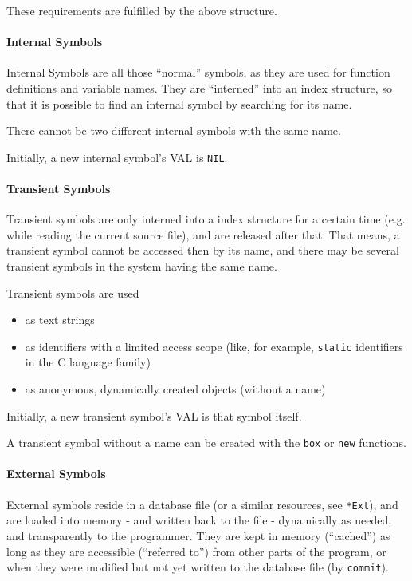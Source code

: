 These requirements are fulfilled by the above structure.

 

\paragraph{Internal Symbols}
\label{sec:refm-internal-symbols}%
Internal Symbols are all those ``normal'' symbols, as they are used for
function definitions and variable names. They are ``interned'' into an
index structure, so that it is possible to find an internal symbol by
searching for its name.

There cannot be two different internal symbols with the same name.

Initially, a new internal symbol's VAL is \texttt{NIL}.



\paragraph{Transient Symbols}
\label{sec:refm-transient-symbols}%
Transient symbols are only interned into a index structure for a certain
time (e.g. while reading the current source file), and are released
after that. That means, a transient symbol cannot be accessed then by
its name, and there may be several transient symbols in the system
having the same name.

Transient symbols are used

\begin{itemize}
\item as text strings
\item as identifiers with a limited access scope (like, for example,
   \texttt{static} identifiers in the C language family)
\item as anonymous, dynamically created objects (without a name)
\end{itemize}

Initially, a new transient symbol's VAL is that symbol itself.

A transient symbol without a name can be created with the \texttt{box} or \texttt{new}
functions.

 

\paragraph{External Symbols}
\label{sec:refm-external-symbols}%
External symbols reside in a database file (or a similar resources, see
\texttt{*Ext}), and are loaded into memory - and written back to the file -
dynamically as needed, and transparently to the programmer. They are
kept in memory (``cached'') as long as they are accessible (``referred to'')
from other parts of the program, or when they were modified but not yet
written to the database file (by \texttt{commit}).

